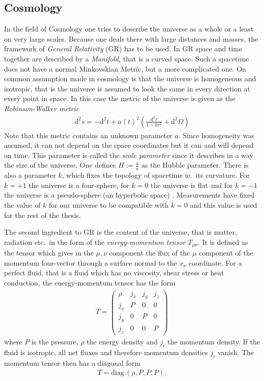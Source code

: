 \documentclass[a4paper, 12pt]{article}
\newcommand{\diff}{\mathrm{d}}
\begin{document}
\subsection{Cosmology}
\noindent
In the field of Cosmology one tries to describe the universe as a whole
or a least on very large scales. Because one deals there with large distances
and masses, the framework of \emph{General Relativity} (GR) has to be used.
In GR space and time together are described by a \emph{Manifold}, that is a curved space.
Such a spacetime does not have a normal Minkovskian Metric, but a more complicated one.
On common assumption made in cosmology is that the universe
is homogeneous and isotropic, that is the universe is assumed to look the same
in every direction at every point in space. In this case the metric of the universe
is given as the \emph{Robinson-Walker metric} \cite[Eq. 2.1]{TheEarlyUniverseKolbAndTurner}
\begin{align}
    \label{eq:flrw}
    \diff^2 s = - \diff^2 t + a(t)^2 \left( \frac{\diff^2 r}{1 - k r^2} + \diff^2 \Omega \right)
\end{align}
Note that this metric contains an unknown parameter $a$. Since homogeneity was assumed,
it can not depend on the space coordinates but it can and will depend on time.
This parameter is called the \emph{scale parameter} since it describes in a way the size
of the universe. One defines $H := \frac{\dot{a}}{a}$
as the Hubble parameter.
There is also a parameter $k$, which fixes the topology of spacetime ie.\ its curvature.
For $k = +1$ the universe is a four-sphere, for $k = 0$ the universe is flat and for $k = -1$ the universe is a pseudo-sphere (an hyperbolic space) \cite[Sec. 3.1]{TheEarlyUniverseKolbAndTurner}.
Measurements have fixed the value of $k$ for our universe to be compatible with $k = 0$ and this value is used for the rest of the thesis.

\noindent
The second ingredient to GR is the content of the universe, that is matter, radiation etc.\ in the form of the \emph{energy-momentum tensor} $T_{\mu \nu}$.
It is defined as the tensor which gives in the $\mu, \nu$ component the flux of the $\mu$ component of the
momentum four-vector through a surface normal to the $x_\nu$ coordinate.
For a perfect fluid, that is a fluid which has no viscosity, shear stress or heat conduction,
the energy-momentum tensor has the form
\begin{align}
    T = \begin{pmatrix}
    \rho & j_x & j_y & j_z \\
    j_x & P & 0 & 0 \\
    j_y & 0 & P & 0 \\
    j_z & 0 & 0 & P
    \end{pmatrix}
\end{align}
where $P$ is the pressure, $\rho$ the energy density and $j_i$ the momentum density.
If the fluid is isotropic, all net fluxes and therefore momentum densities $j_i$ vanish. The momentum tensor then has a diagonal form \cite[Eq. 3.4]{TheEarlyUniverseKolbAndTurner}
\begin{align}
    \label{eq:energy_momentum_tensor_diag}
    T = \mathrm{diag} \, (\rho, P, P, P).
\end{align}
\end{document}

